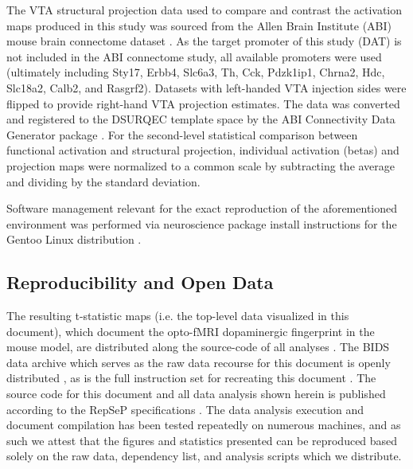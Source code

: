 The VTA structural projection data used to compare and contrast the activation maps produced in this study was sourced from the Allen Brain Institute (ABI) mouse brain connectome dataset \cite{abic}.
As the target promoter of this study (DAT) is not included in the ABI connectome study, all available promoters were used (ultimately including Sty17, Erbb4, Slc6a3, Th, Cck, Pdzk1ip1, Chrna2, Hdc, Slc18a2, Calb2, and Rasgrf2).
Datasets with left-handed VTA injection sides were flipped to provide right-hand VTA projection estimates.
The data was converted and registered to the DSURQEC template space by the ABI Connectivity Data Generator package \cite{abic_g}.
For the second-level statistical comparison between functional activation and structural projection, individual activation (betas) and projection maps were normalized to a common scale by subtracting the average and dividing by the standard deviation.

Software management relevant for the exact reproduction of the aforementioned environment was performed via neuroscience package install instructions for the Gentoo Linux distribution \cite{ng}.

\subsection{Reproducibility and Open Data}

The resulting t-statistic maps (i.e. the top-level data visualized in this document), which document the opto-fMRI dopaminergic fingerprint in the mouse model, are distributed along the source-code of all analyses \cite{me}.
The BIDS \cite{bids} data archive which serves as the raw data recourse for this document is openly distributed \cite{opfvta_bidsdata}, as is the full instruction set for recreating this document \cite{me}.
The source code for this document and all data analysis shown herein is published according to the RepSeP specifications \cite{repsep}.
The data analysis execution and document compilation has been tested repeatedly on numerous machines, and as such we attest that the figures and statistics presented can be reproduced based solely on the raw data, dependency list, and analysis scripts which we distribute.

